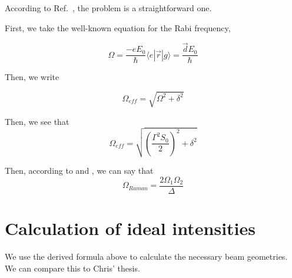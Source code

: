 According to Ref.\ \cite{cjeDiss}, the problem is a straightforward one.

First, we take the well-known equation for the Rabi frequency, 

\begin{equation}
\Omega = \frac{-eE_0}{\hbar}\langle e |\vec{r}|g\rangle=\frac{\vec{d}E_0}{\hbar}
\end{equation}

Then, we write 

\begin{equation}
\Omega_\mathit{eff}=\sqrt{\Omega^2+\delta^2}
\end{equation}

Then, we see that 
\begin{equation}
\Omega_\mathit{eff}=\sqrt{\left(\frac{\Gamma^2S_0}{2}\right)^2 + \delta^2}
\end{equation}

Then, according to \cite{RamanBeamSplit} and \cite{footAtomicPhysics}, we can say that 
\begin{equation} \label{KorsunskysJewel}
\Omega_\mathit{Raman}=\frac{2\Omega_1\Omega_2}{\Delta}
\end{equation}

  \section{Calculation of ideal intensities}

We use the derived formula above to calculate the necessary beam geometries. We can compare this to Chris' thesis. 


